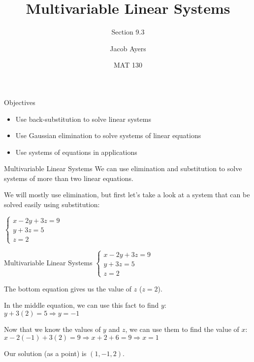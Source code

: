 \documentclass[t]{beamer}
\title[9.3]{Multivariable Linear Systems}
\subtitle{Section 9.3}
\author{Jacob Ayers}
\institute{Lesson \#23}
\date{MAT 130}
\def\then{\Rightarrow}
\begin{document}
	
	\begin{frame}
		\titlepage
	\end{frame}
	
	\begin{frame}{Objectives}
		\begin{itemize}
			\item Use back-substitution to solve linear systems
			\item Use Gaussian elimination to solve systems of linear equations
			\item Use systems of equations in applications
		\end{itemize}
	\end{frame}

	\begin{frame}{Multivariable Linear Systems}
		We can use elimination and substitution to solve systems of more than two linear equations. \pause
		
		We will mostly use elimination, but first let's take a look at a system that can be solved easily using substitution: \pause
		
		$\begin{cases}
		x - 2y + 3z = 9 \\ y + 3z = 5 \\ z = 2
		\end{cases}$ \pause
	\end{frame}

	\begin{frame}{Multivariable Linear Systems}
		$\begin{cases}
		x - 2y + 3z = 9 \\ y + 3z = 5 \\ z = 2
		\end{cases}$ \pause
		
		The bottom equation gives us the value of $z$ ($z = 2$). \pause
		
		In the middle equation, we can use this fact to find $y$: \\ $y + 3(2) = 5 \then y = -1$ \pause
		
		Now that we know the values of $y$ and $z$, we can use them to find the value of $x$: \\
		$x - 2(-1) + 3(2) = 9 \then x + 2 + 6 = 9 \then x = 1$ \pause
		
		Our solution (as a point) is $(1, -1, 2)$.
	\end{frame}
\end{document}
